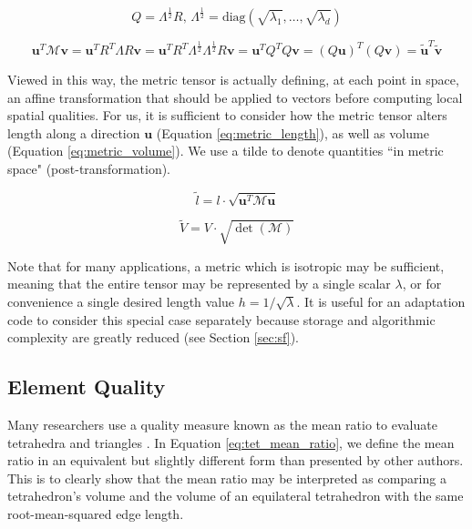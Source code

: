 \begin{equation} \label{eq:metric_transform}
Q = \Lambda^{\frac12} R,\,
\Lambda^{\frac12} = \text{diag}(\sqrt{\lambda_1},\dots,\sqrt{\lambda_d})
\end{equation}

\begin{equation} \label{eq:metric_space_product}
\mathbf{u}^T \mathcal{M}\mathbf{v} =
\mathbf{u}^T R^T\Lambda R\mathbf{v} =
\mathbf{u}^T R^T\Lambda^{\frac12} \Lambda^{\frac12}R\mathbf{v} =
\mathbf{u}^T Q^T Q\mathbf{v} =
(Q\mathbf{u})^T (Q\mathbf{v}) =
\tilde{\mathbf{u}}^T \tilde{\mathbf{v}}
\end{equation}

Viewed in this way, the metric tensor is actually defining,
at each point in space, an affine transformation that should
be applied to vectors before computing local spatial qualities.
For us, it is sufficient to consider how the metric tensor
alters length along a direction $\mathbf{u}$ (Equation \ref{eq:metric_length}),
as well as volume (Equation \ref{eq:metric_volume}).
We use a tilde to denote quantities ``in metric space" (post-transformation).

\begin{equation} \label{eq:metric_length}
\tilde{l} = l \cdot \sqrt{\mathbf{u}^T\mathcal{M}\mathbf{u}}
\end{equation}

\begin{equation} \label{eq:metric_volume}
\tilde{V} = V \cdot \sqrt{\det(\mathcal{M})}
\end{equation}

Note that for many applications, a metric which is isotropic
may be sufficient, meaning that the entire tensor may be represented
by a single scalar $\lambda$, or for convenience a single
desired length value $h=1/\sqrt{\lambda}$.
It is useful for an adaptation code to consider this special case
separately because storage and algorithmic complexity are greatly
reduced (see Section \ref{sec:sf}).

\subsection{Element Quality}
\label{sec:def_quality}

Many researchers use a quality measure known as the mean ratio
to evaluate tetrahedra and triangles
\cite{loseille2015parallel,compere2010mesh,
li20053d,liu1994relationship}.
In Equation \ref{eq:tet_mean_ratio}, we define the mean ratio
in an equivalent but slightly different form than presented by other
authors.
This is to clearly show that the mean ratio may be interpreted
as comparing a tetrahedron's volume and the volume of
an equilateral tetrahedron with the same root-mean-squared edge length.

